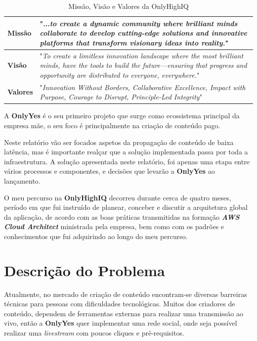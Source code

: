 \begin{table}[H]  %
\caption{Missão, Visão e Valores da OnlyHighIQ}
\label{tab:missao_visao_valores}
\begin{center}
\begin{tabular}{|l|p{10cm}|}
\hline
\textbf{Missão} & "...\textit{to create a dynamic community where brilliant minds collaborate to develop cutting-edge solutions and innovative platforms that transform visionary ideas into reality.}" \cite{OYI} \\ \hline
\textbf{Visão} & "\textit{To create a limitless innovation landscape where the most brilliant minds, have the tools to build the future—ensuring that progress and opportunity are distributed to everyone, everywhere.}" \cite{OYI} \\ \hline
\textbf{Valores} & "\textit{Innovation Without Borders, Collaborative Excellence, Impact with Purpose, Courage to Disrupt, Principle-Led Integrity}" \cite{OYI} \\ \hline
\end{tabular}
\end{center}
\end{table}

A \textbf{OnlyYes} é o seu primeiro projeto que surge como ecossistema principal da empresa mãe, o seu foco é principalmente na criação de conteúdo pago. 

Neste relatório vão ser focados aspetos da propagação de conteúdo de baixa latência, mas é importante realçar que a solução implementada passa por toda a infraestrutura. A solução apresentada neste relatório, foi apenas uma etapa entre vários processos e componentes, e decisões que levarão a \textbf{OnlyYes} ao lançamento.

O meu percurso na \textbf{OnlyHighIQ} decorreu durante cerca de quatro meses, período em que fui instruído de planear, conceber e discutir a arquitetura global da aplicação, de acordo com as boas práticas transmitidas na formação \textbf{\textit{AWS Cloud Architect}} ministrada pela empresa, bem como com os padrões e conhecimentos que fui adquirindo ao longo do meu percurso.


\section{Descrição do Problema} \label{Problema}

Atualmente, no mercado de criação de conteúdo encontram-se diversas barreiras técnicas para pessoas com dificuldades tecnológicas. Muitos dos criadores de conteúdo, dependem de ferramentas externas para realizar uma transmissão ao vivo, então a \textbf{OnlyYes} quer implementar uma rede social, onde seja possível realizar uma \textit{livestream} com poucos cliques e pré-requisitos.

